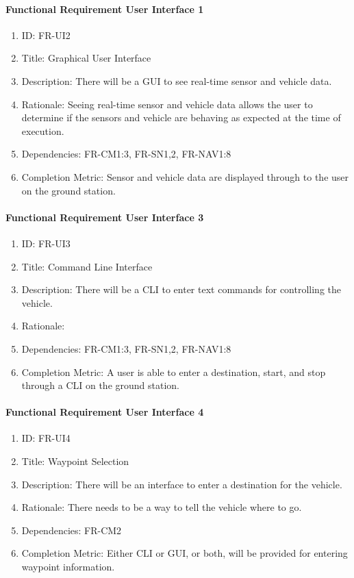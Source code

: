 \documentclass[compsoc,draftclsnofoot,onecolumn,10pt]{IEEEtran}
\begin{document}
	\paragraph{Functional Requirement User Interface 1}
		\begin{enumerate}
			\item ID: FR-UI2
			\item Title: Graphical User Interface
			\item Description: There will be a GUI to see real-time sensor and vehicle data.
			\item Rationale: Seeing real-time sensor and vehicle data allows the user to determine if the sensors and vehicle are behaving as expected at the time of execution.
			\item Dependencies: FR-CM1:3, FR-SN1,2, FR-NAV1:8
			\item Completion Metric: Sensor and vehicle data are displayed through to the user on the ground station.
		\end{enumerate}

	\paragraph{Functional Requirement User Interface 3}
		\begin{enumerate}
			\item ID: FR-UI3
			\item Title: Command Line Interface
			\item Description: There will be a CLI to enter text commands for controlling the vehicle.
			\item Rationale: 
			\item Dependencies: FR-CM1:3, FR-SN1,2, FR-NAV1:8
			\item Completion Metric: A user is able to enter a destination, start, and stop through a CLI on the ground station.
		\end{enumerate}

	\paragraph{Functional Requirement User Interface 4}
		\begin{enumerate}
			\item ID: FR-UI4
			\item Title: Waypoint Selection
			\item Description: There will be an interface to enter a destination for the vehicle.
			\item Rationale: There needs to be a way to tell the vehicle where to go.
			\item Dependencies: FR-CM2
			\item Completion Metric: Either CLI or GUI, or both, will be provided for entering waypoint information.
		\end{enumerate}
\end{document}
